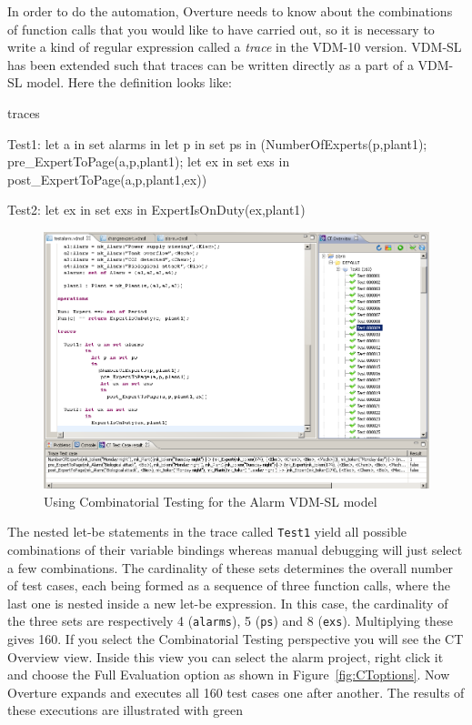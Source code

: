 In order to do the automation, Overture needs to know about the combinations of function calls that you would like to have carried out, so it is necessary to write a kind of regular expression called a
\emph{trace} in the VDM-10 version. VDM-SL has been extended such that traces can be written directly as a part of a VDM-SL model. Here the definition looks like:
%
\begin{vdmsl}
traces

  Test1: let a in set alarms
         in
           let p in set ps 
           in
             (NumberOfExperts(p,plant1);
              pre_ExpertToPage(a,p,plant1);
              let ex in set exs
              in
                post_ExpertToPage(a,p,plant1,ex))
               
  Test2: let ex in set exs
         in
           ExpertIsOnDuty(ex,plant1)
\end{vdmsl}
%
\begin{figure}[htbp]
\begin{center}
\includegraphics[width=5.5in]{figures/tracesalarm}
\caption{Using Combinatorial Testing for the Alarm VDM-SL model\label{fig:stracesalarm}}
\end{center}
\end{figure}
%
\noindent The nested let-be statements in the trace called \texttt{Test1} yield all possible combinations of their variable bindings whereas manual debugging will just select a few combinations. The cardinality of these sets determines the overall number of test cases, each being formed as a sequence of three function calls, where the last one is nested inside a new let-be expression. In this case, the cardinality of the three sets are respectively 4 (\texttt{alarms}), 5 (\texttt{ps}) and 8 (\texttt{exs}). Multiplying these gives 160. If you select the Combinatorial Testing perspective you will see the \textsf{CT Overview} view. Inside this view you can select the alarm project, right click it and choose the \textsf{Full Evaluation} option as shown in Figure~\ref{fig:CToptions}.  Now Overture expands and executes all 160 test cases one after another. The results of these executions are illustrated with green
